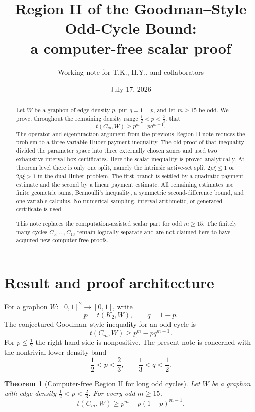 \documentclass[11pt]{article}
\title{Region II of the Goodman--Style Odd-Cycle Bound:\\
       a computer-free scalar proof}
\author{Working note for T.K., H.Y., and collaborators}
\date{July 17, 2026}
\newtheorem{theorem}{Theorem}[section]
\begin{document}
\maketitle

\begin{abstract}
Let $W$ be a graphon of edge density $p$, put $q=1-p$, and let $m\ge15$ be
odd.  We prove, throughout the remaining density range
$\tfrac12<p<\tfrac23$, that
\[
        t(C_m,W)\ge p^m-pq^{m-1}.
\]
The operator and eigenfunction argument from the previous Region-II note
reduces the problem to a three-variable Huber payment inequality.  The old
proof of that inequality divided the parameter space into three externally
chosen zones and used two exhaustive interval-box certificates.  Here the
scalar inequality is proved analytically.  At theorem level there is only one
split, namely the intrinsic active-set split
$2\rho\xi\le1$ or $2\rho\xi>1$ in the dual Huber problem.  The first branch is
settled by a quadratic payment estimate and the second by a linear payment
estimate.  All remaining estimates use finite geometric sums, Bernoulli's
inequality, a symmetric second-difference bound, and one-variable calculus.
No numerical sampling, interval arithmetic, or generated certificate is used.

This note replaces the computation-assisted scalar part for odd $m\ge15$.
The finitely many cycles $C_5,\ldots,C_{13}$ remain logically separate and
are not claimed here to have acquired new computer-free proofs.
\end{abstract}

\tableofcontents

\section{Result and proof architecture}\label{sec:intro}

For a graphon $W:[0,1]^2\to[0,1]$, write
\[
        p=t(K_2,W),\qquad q=1-p.
\]
The conjectured Goodman--style inequality for an odd cycle is
\begin{equation}\label{eq:goal}
        t(C_m,W)\ge p^m-pq^{m-1}.
\end{equation}
For $p\le\tfrac12$ the right-hand side is nonpositive.  The present note is
concerned with the nontrivial lower-density band
\[
        \frac12<p<\frac23,
        \qquad \frac13<q<\frac12.
\]

\begin{theorem}[Computer-free Region II for long odd cycles]\label{thm:main}
Let $W$ be a graphon with edge density $\tfrac12<p<\tfrac23$.  For every odd
$m\ge15$,
\[
        t(C_m,W)\ge p^m-p(1-p)^{m-1}.
\]
\end{theorem}
\end{document}
